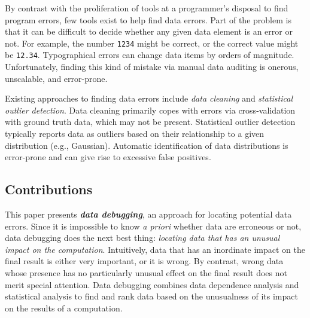 


By contrast with the proliferation of tools at a programmer's disposal
to find program errors, few tools exist to help find data errors. Part
of the problem is that it can be difficult to decide whether any given
data element is an error or not. For example, the number \texttt{1234}
might be correct, or the correct value might
be \texttt{12.34}. Typographical errors can change data items by
orders of magnitude. Unfortunately, finding this kind of mistake via
manual data auditing is onerous, unscalable, and error-prone.




Existing approaches to finding data errors include
\emph{data cleaning} and  \emph{statistical outlier detection}.
Data cleaning primarily copes with errors via
cross-validation with ground truth data, which may not be
present. Statistical outlier detection typically reports data as
outliers based on their relationship to a given distribution (e.g.,
Gaussian).  Automatic identification of data distributions is
error-prone and can give rise to excessive false positives.



\subsection*{Contributions}

This paper presents \emph{\bf data debugging}, an approach for locating
potential data errors. Since it is impossible to know \emph{a priori}
whether data are erroneous or not, data debugging does the next best
thing: \emph{locating data that has an unusual
impact on the computation}. Intuitively, data that has an inordinate impact on the final
result is either very important, or it is wrong. By contrast, wrong
data whose presence has no particularly unusual effect on the final result does not
merit special attention.  Data debugging combines data dependence
analysis and statistical analysis to find and rank data based on the unusualness of its
impact on the results of a computation.

